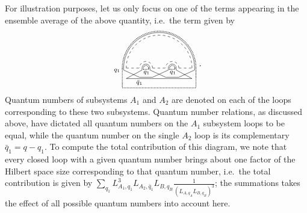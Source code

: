 \documentclass[aps,pra,reprint,superscriptaddress,twocolumn,notitlepage]{revtex4-1}
\numberwithin{equation}{section}
\begin{document}
For illustration purposes, let us only focus on one of the terms appearing in the ensemble average of the above quantity, i.e.~the term given by
\begin{equation}
    \tikz[scale=0.55,baseline=0.5ex]{
    \draw[dashed] (0,0) -- (1,0);
    \draw (-0.2,0.)-- (-0.2,-0.15);
    \draw (-0.2,-0.15)-- (1.,-0.7);
    \draw (1.2,-0.15)-- (1.2,0.);
    \draw (1.2,-0.15)-- (0,-0.8);
    \draw[densely dotted,thick] (-0.3,0)-- (-0.3,-1.45);
    \draw[densely dotted,thick] (1.3,-0.1)-- (1.3,0.);
    \draw[dashed] (2,0) -- (3,0);
    \draw (1.8,0.)-- (1.8,-0.15);
    \draw (1.8,-0.15)-- (3.,-0.7);
    \draw (3.2,-0.15)-- (3.2,0.);
    \draw (3.2,-0.15)-- (2,-0.7);
    \draw[densely dotted,thick] (1.7,0.)-- (1.7,-0.1);
    \draw[densely dotted,thick] (3.3,-0.1)-- (3.3,0.);
    \draw[dashed] (4,0) -- (5,0);
    \draw (3.8,0.)-- (3.8,-0.15);
    \draw (3.8,-0.15)-- (5.,-0.8);
    \draw (5.2,-0.15)-- (5.2,0.);
    \draw (5.2,-0.15)-- (4,-0.7);
    \draw[densely dotted,thick] (3.7,0.)-- (3.7,-0.1);
    \draw[densely dotted,thick] (5.3,-1.45)-- (5.3,0.);
    \draw[densely dotted,thick] (1.3,-0.1)--(1.7,-0.1);
    \draw[densely dotted,thick](3.3,-0.1)--(3.7,-0.1);
    \draw[densely dotted,thick](-0.3,-1.5)--(5.3,-1.5);
    \draw (3,-0.7)--(4.,-0.7);
    \draw (0,-0.8)--(5.,-0.8);
    \draw (1.0,-0.7)-- (2,-0.7);
    \draw[densely dotted,thick] (5.3,0) arc (0:180:2.8);
    \draw[densely dotted,thick] (1.7,0) arc (0:180:0.2);
    \draw[densely dotted,thick] (3.7,0) arc (0:180:0.2);
    \draw[dashed] (4.0,0) arc (0:180:0.5);
    \draw[dashed] (2.0,0) arc (0:180:0.5);
    \draw[dashed] (5.0,0) arc (0:180:2.5);
    \draw (3.8,0) arc (0:180:0.3);
    \draw (1.8,0) arc (0:180:0.3);
    \draw (5.2,0) arc (0:180:2.7);
    \draw (-0.7,-0.2) circle (0.) node[anchor=center] {\scriptsize$q_1$};
    \draw (1.55,-0.35) circle (0.) node[anchor=center] {\scriptsize$q_1$};
    \draw (3.55,-0.35) circle (0.) node[anchor=center] {\scriptsize$q_1$};
    \draw (1.,-1.1) circle (0.) node[anchor=center] {\scriptsize$\bar{q}_1$};
    } \ .
\end{equation}
Quantum numbers of subsystems $A_1$ and $A_2$ are denoted on each of the loops corresponding to these two subsystems. Quantum number relations, as discussed above, have dictated all quantum numbers on the $A_1$ subsystem loops to be equal, while the quantum number on the single $A_2$ loop is its complementary $\bar{q}_1 = q-q_1$. To compute the total contribution of this diagram, we note that every closed loop with a given quantum number brings about one factor of the Hilbert space size corresponding to that quantum number, i.e.~the total contribution is given by $\sum_{q_1} L_{A_1,q_1}^3 L_{A_2,\bar{q}_1} L_{B,q_B} \frac{1}{\left( L_{A,q_A} L_{B,q_B} \right)^3}$; the summations takes the effect of all possible quantum numbers into account here.
\end{document}
